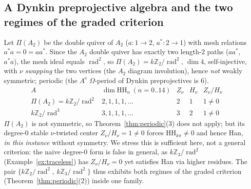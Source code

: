 \documentclass[11pt]{amsart}
\theoremstyle{definition}
\newcommand{\HH}{\mathrm{HH}}
\newcommand{\rad}{\operatorname{rad}}
\newcommand{\Ae}{A^{\mathrm{e}}}
\newcommand{\kk}{k}
\newcommand{\Z}{\mathbb{Z}}
\begin{document}
\subsection{A Dynkin preprojective algebra and the two regimes of the graded
criterion}\label{ex:prepro}
Let $\Pi(A_2)$ be the double quiver of $A_2$ ($a\colon1\to2$, $a^*\colon2\to1$)
with mesh relations $a^*a=0=aa^*$. Since the $A_2$ double quiver has exactly two
length-$2$ paths ($aa^*$, $a^*a$), the mesh ideal equals $\rad^2$, so
$\Pi(A_2)=\kk\Z_2/\rad^2$, $\dim4$, self-injective, with $\nu$ \emph{swapping}
the two vertices (the $A_2$ diagram involution), hence \emph{not} weakly
symmetric; periodic (the $\Ae$ $\Omega$-period of Dynkin preprojectives is $6$).
\[
\begin{array}{l|cccc}
A & \dim\HH_n\ (n=0..14) & Z_\nu & H_\nu & Z_\nu/H_\nu\\
\hline
\Pi(A_2)=\kk\Z_2/\rad^2 & 2,1,1,1,\dots & 2 & 1 & 1\neq0\\
\kk\Z_2/\rad^3 & 3,1,1,1,\dots & 3 & 2 & 1\neq0
\end{array}
\]
$\Pi(A_2)$ is not symmetric, so Theorem~\ref{thm:periodic}(3) does not apply;
but its degree-$0$ stable $\nu$-twisted center $Z_\nu/H_\nu=1\ne0$ forces
$\HH_{k\pi}\ne0$ and hence Han, \emph{in this instance} without symmetry. We
stress this is sufficient here, not a general criterion: the naive degree-$0$
form is false in general, as $\kk\Z_3/\rad^2$ (Example~\ref{ex:traceless}) has
$Z_\nu/H_\nu=0$ yet satisfies Han via higher residues. The pair
$\{\kk\Z_2/\rad^2,\ \kk\Z_3/\rad^2\}$ thus exhibits both regimes of the graded
criterion (Theorem~\ref{thm:periodic}(2)) inside one family.
\end{document}
